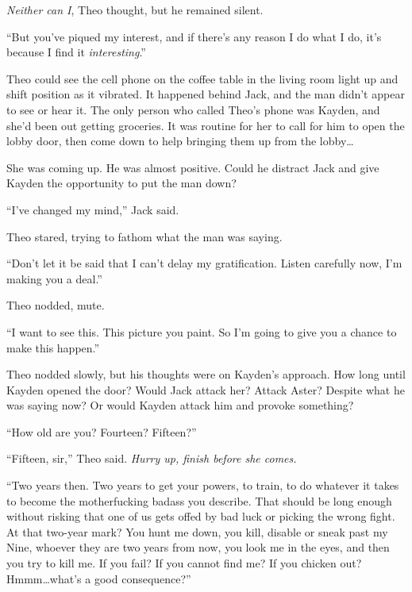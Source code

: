 \emph{Neither can I}, Theo thought, but he remained silent.



``But you've piqued my interest, and if there's any reason I do what I do, it's because I find it \emph{interesting}.''



Theo could see the cell phone on the coffee table in the living room light up and shift position as it vibrated.  It happened behind Jack, and the man didn't appear to see or hear it.  The only person who called Theo's phone was Kayden, and she'd been out getting groceries.  It was routine for her to call for him to open the lobby door, then come down to help bringing them up from the lobby\ldots



She was coming up.  He was almost positive.  Could he distract Jack and give Kayden the opportunity to put the man down?



``I've changed my mind,'' Jack said.



Theo stared, trying to fathom what the man was saying.



``Don't let it be said that I can't delay my gratification.  Listen carefully now, I'm making you a deal.''



Theo nodded, mute.



``I want to see this.  This picture you paint.  So I'm going to give you a chance to make this happen.''



Theo nodded slowly, but his thoughts were on Kayden's approach.  How long until Kayden opened the door?  Would Jack attack her?  Attack Aster?  Despite what he was saying now?  Or would Kayden attack him and provoke something?



``How old are you?  Fourteen? Fifteen?''



``Fifteen, sir,'' Theo said.  \emph{Hurry up, finish before she comes.}



``Two years then.  Two years to get your powers, to train, to do whatever it takes to become the motherfucking badass you describe.  That should be long enough without risking that one of us gets offed by bad luck or picking the wrong fight.  At that two-year mark?  You hunt me down, you kill, disable or sneak past my Nine, whoever they are two years from now, you look me in the eyes, and then you try to kill me.  If you fail?  If you cannot find me?  If you chicken out?  Hmmm\ldots what's a good consequence?''



